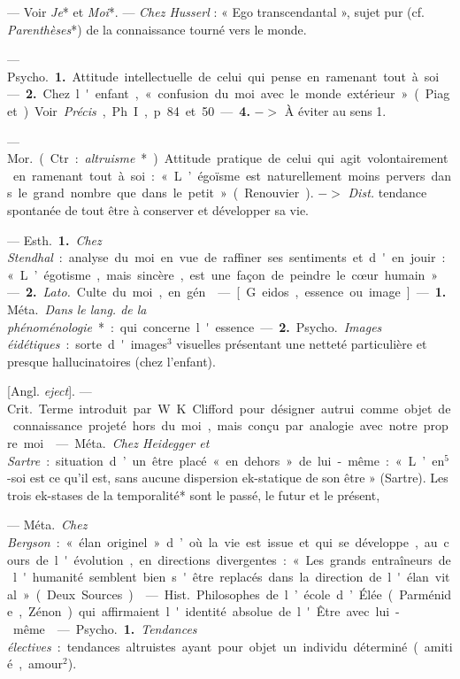 \begin{itemize}[leftmargin=1cm, label=, itemsep=1pt]
 — Voir {\it Je}* et {\it Moi}*. — {\it Chez
Husserl} : « Ego transcendantal »,
sujet pur (cf. {\it Parenthèses}*) de la
connaissance tourné vers le monde.

 — \si{Psycho.} {\bf 1.} Attitude
intellectuelle de celui qui pense
en ramenant tout à soi. — {\bf 2.} Chez
l'enfant, « confusion du moi avec le
monde extérieur » (Piaget). Voir
 {\it Précis}, Ph. I, p. 84 et 50 — {\bf 4.} $->$ À
éviter au sens 1.

 — \si{Mor.} (Ctr. : {\it altruisme}*).
Attitude pratique de celui qui agit
volontairement en ramenant tout à
soi : « L’égoïsme est naturellement
moins pervers dans le grand nombre
que dans le petit » (Renouvier).
$->$ {\it Dist.} tendance spontanée de
tout être à conserver et développer
sa vie.

 — \si{Esth.} {\bf 1.} {\it Chez Stendhal} :
analyse du moi en vue de raffiner
ses sentiments et d'en jouir : « L’égotisme, mais sincère, est une façon de
peindre le cœur humain ». — {\bf 2.} {\it Lato.}
Culte du moi, en gén.

 — [G. eidos, essence ou image]
— {\bf 1.} \si{Méta.} {\it Dans le lang. de la phénoménologie}* :
qui concerne l'essence.
— {\bf 2.} \si{Psycho.} {\it Images éidétiques} :
sorte d'images$^3$ visuelles présentant
une netteté particulière et presque
hallucinatoires (chez l'enfant).

 [Angl. {\it eject}]. — \si{Crit.} Terme introduit par W. K.
Clifford pour désigner autrui comme objet de connaissance projeté hors
du moi, mais conçu par analogie avec notre propre moi.

 — \si{Méta.} {\it Chez Heidegger
et Sartre} : situation d’un être placé
« en dehors » de lui-même : « L’en$^5$-soi est ce qu'il est, sans aucune dispersion ek-statique de son être »
(Sartre). Les trois ek-stases de la
temporalité* sont le passé, le futur et le présent,

 — \si{Méta.} {\it Chez Bergson} :
« élan originel » d’où la vie est issue et qui se développe, au cours de
l'évolution, en directions divergentes : « Les grands entraîneurs de
l'humanité semblent bien s'être
replacés dans la direction de l'élan vital » (Deux Sources).

 — \si{Hist.} Philosophes de l’école
d’Élée (Parménide, Zénon) qui
affirmaient l'identité absolue de
l'Être avec lui-même.

 — \si{Psycho.} {\bf 1.} {\it Tendances électives} :
tendances altruistes ayant
pour objet un individu déterminé (amitié, amour$^2$).


\end{itemize}
